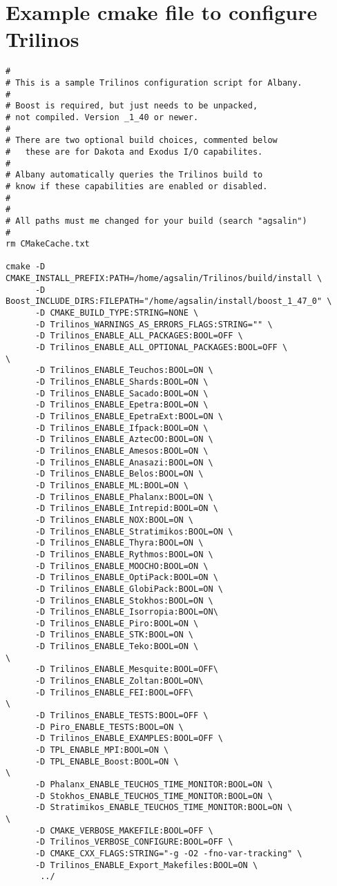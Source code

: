 \documentclass[pdf,12pt,report,strict]{SANDreport}
\theoremstyle{remark}
\begin{document}
\section{Example cmake file to configure Trilinos}
\begin{verbatim}
#
# This is a sample Trilinos configuration script for Albany.
#
# Boost is required, but just needs to be unpacked,
# not compiled. Version _1_40 or newer.
#
# There are two optional build choices, commented below
#   these are for Dakota and Exodus I/O capabilites.
#
# Albany automatically queries the Trilinos build to 
# know if these capabilities are enabled or disabled.
#
#
# All paths must me changed for your build (search "agsalin")
#
rm CMakeCache.txt

cmake -D CMAKE_INSTALL_PREFIX:PATH=/home/agsalin/Trilinos/build/install \
      -D Boost_INCLUDE_DIRS:FILEPATH="/home/agsalin/install/boost_1_47_0" \
      -D CMAKE_BUILD_TYPE:STRING=NONE \
      -D Trilinos_WARNINGS_AS_ERRORS_FLAGS:STRING="" \
      -D Trilinos_ENABLE_ALL_PACKAGES:BOOL=OFF \
      -D Trilinos_ENABLE_ALL_OPTIONAL_PACKAGES:BOOL=OFF \
\
      -D Trilinos_ENABLE_Teuchos:BOOL=ON \
      -D Trilinos_ENABLE_Shards:BOOL=ON \
      -D Trilinos_ENABLE_Sacado:BOOL=ON \
      -D Trilinos_ENABLE_Epetra:BOOL=ON \
      -D Trilinos_ENABLE_EpetraExt:BOOL=ON \
      -D Trilinos_ENABLE_Ifpack:BOOL=ON \
      -D Trilinos_ENABLE_AztecOO:BOOL=ON \
      -D Trilinos_ENABLE_Amesos:BOOL=ON \
      -D Trilinos_ENABLE_Anasazi:BOOL=ON \
      -D Trilinos_ENABLE_Belos:BOOL=ON \
      -D Trilinos_ENABLE_ML:BOOL=ON \
      -D Trilinos_ENABLE_Phalanx:BOOL=ON \
      -D Trilinos_ENABLE_Intrepid:BOOL=ON \
      -D Trilinos_ENABLE_NOX:BOOL=ON \
      -D Trilinos_ENABLE_Stratimikos:BOOL=ON \
      -D Trilinos_ENABLE_Thyra:BOOL=ON \
      -D Trilinos_ENABLE_Rythmos:BOOL=ON \
      -D Trilinos_ENABLE_MOOCHO:BOOL=ON \
      -D Trilinos_ENABLE_OptiPack:BOOL=ON \
      -D Trilinos_ENABLE_GlobiPack:BOOL=ON \
      -D Trilinos_ENABLE_Stokhos:BOOL=ON \
      -D Trilinos_ENABLE_Isorropia:BOOL=ON\
      -D Trilinos_ENABLE_Piro:BOOL=ON \
      -D Trilinos_ENABLE_STK:BOOL=ON \
      -D Trilinos_ENABLE_Teko:BOOL=ON \
\
      -D Trilinos_ENABLE_Mesquite:BOOL=OFF\
      -D Trilinos_ENABLE_Zoltan:BOOL=ON\
      -D Trilinos_ENABLE_FEI:BOOL=OFF\
\
      -D Trilinos_ENABLE_TESTS:BOOL=OFF \
      -D Piro_ENABLE_TESTS:BOOL=ON \
      -D Trilinos_ENABLE_EXAMPLES:BOOL=OFF \
      -D TPL_ENABLE_MPI:BOOL=ON \
      -D TPL_ENABLE_Boost:BOOL=ON \
\
      -D Phalanx_ENABLE_TEUCHOS_TIME_MONITOR:BOOL=ON \
      -D Stokhos_ENABLE_TEUCHOS_TIME_MONITOR:BOOL=ON \
      -D Stratimikos_ENABLE_TEUCHOS_TIME_MONITOR:BOOL=ON \
\
      -D CMAKE_VERBOSE_MAKEFILE:BOOL=OFF \
      -D Trilinos_VERBOSE_CONFIGURE:BOOL=OFF \
      -D CMAKE_CXX_FLAGS:STRING="-g -O2 -fno-var-tracking" \
      -D Trilinos_ENABLE_Export_Makefiles:BOOL=ON \
       ../


\end{verbatim}
\end{document}
